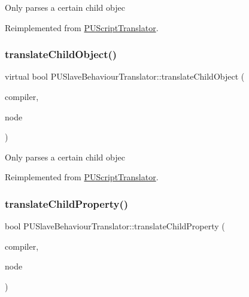 Only parses a certain child objec 

Reimplemented from \hyperlink{classPUScriptTranslator_ab587d01348ae3e678cb700c719b2b113}{P\+U\+Script\+Translator}.

\mbox{\label{classPUSlaveBehaviourTranslator_ac7ba1a952d262033c1d10d770eec9fd4}} 
\subsubsection{\texorpdfstring{translate\+Child\+Object()}{translateChildObject()}\hspace{0.1cm}{\footnotesize\ttfamily [2/2]}}
{\footnotesize\ttfamily virtual bool P\+U\+Slave\+Behaviour\+Translator\+::translate\+Child\+Object (\begin{DoxyParamCaption}\item[{\hyperlink{classPUScriptCompiler}{P\+U\+Script\+Compiler} $\ast$}]{compiler,  }\item[{\hyperlink{classPUAbstractNode}{P\+U\+Abstract\+Node} $\ast$}]{node }\end{DoxyParamCaption})\hspace{0.3cm}{\ttfamily [virtual]}}

Only parses a certain child objec 

Reimplemented from \hyperlink{classPUScriptTranslator_ab587d01348ae3e678cb700c719b2b113}{P\+U\+Script\+Translator}.

\mbox{\label{classPUSlaveBehaviourTranslator_aad5bf398d3a89d8695ba3368a78c9aa3}} 
\subsubsection{\texorpdfstring{translate\+Child\+Property()}{translateChildProperty()}\hspace{0.1cm}{\footnotesize\ttfamily [1/2]}}
{\footnotesize\ttfamily bool P\+U\+Slave\+Behaviour\+Translator\+::translate\+Child\+Property (\begin{DoxyParamCaption}\item[{\hyperlink{classPUScriptCompiler}{P\+U\+Script\+Compiler} $\ast$}]{compiler,  }\item[{\hyperlink{classPUAbstractNode}{P\+U\+Abstract\+Node} $\ast$}]{node }\end{DoxyParamCaption})\hspace{0.3cm}{\ttfamily [virtual]}}

